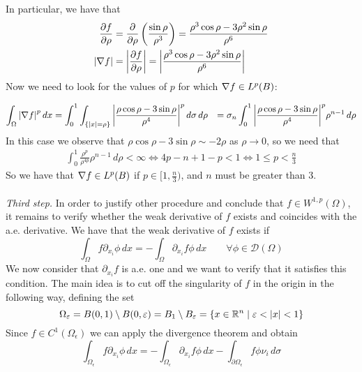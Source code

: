 In particular, we have that
\begin{align*}
\frac{\partial f}{\partial \rho} & = \frac{\partial }{\partial \rho}\left(\frac{\sin\rho}{\rho^3}\right) = \frac{\rho^3 \cos\rho  - 3  \rho^2 \sin\rho}{\rho^6}\\
\abs{\nabla f} & = \abs{\frac{\partial f}{\partial \rho}} = \abs{\frac{\rho^3 \cos\rho  - 3 \rho^2 \sin\rho }{\rho^6}}
\end{align*}
Now we need to look for the values of $p$ for which \(\nabla f \in L^p(B)\):

\begin{align*}
\int_\Omega \abs{\nabla f}^p \, dx &= \int_0^1 \int_{\left\{\abs{x} = \rho\right\}} \abs{\frac{\rho \cos\rho  - 3 \sin\rho }{\rho^4}}^p \, d\sigma \, d\rho 
                                  &= \sigma_n \int_0^1 \abs{\frac{\rho \cos\rho  - 3 \sin\rho }{\rho^4}}^p \rho^{n-1} \, d\rho \\
\end{align*}
In this case we observe that $\rho \cos\rho  - 3 \sin\rho \sim -2\rho$ as $\rho \to 0$, so we need that
\[
    \begin{split}
        \int_0^1 \frac{\rho^p} {\rho^{4p}} \rho^{n-1} \, d\rho < \infty \iff 4p - n + 1 - p < 1 \iff 1 \leq p < \frac{n}{3}
    \end{split}
\]
So we have that \(\nabla f \in L^p(B)\) if \(p \in [1, \frac{n}{3})\), and $n$ must be greater than 3.\\
\vspace{0.1cm}\\
\textit{Third step.} In order to justify other procedure and conclude that $f \in W^{1,p}(\Omega)$, 
it remains to verify whether the weak derivative of \(f\) exists and coincides with the a.e. derivative.
We have that the weak derivative of \(f\) exists if
\begin{equation}\label{eq:weak_derivative}
\int_\Omega f \partial_{x_i} \phi \, dx = - \int_\Omega \partial_{x_i} f \phi \, dx \qquad \forall \phi \in \mathcal{D}(\Omega)
\end{equation}
We now consider that $\partial_{x_i} f$ is a.e. one and we want to verify that it satisfies this condition. 
The main idea is to cut off the singularity of \(f\) in the origin in the following way, defining the set
\[
    \Omega_\varepsilon = B(0, 1) \setminus B(0, \varepsilon) = B_1 \setminus B_\varepsilon = \left\{ x \in \mathbb{R}^n \mid \varepsilon < \abs{x} < 1 \right\}
\]
Since \(f \in C^1(\Omega_\epsilon)\) we can apply the divergence theorem and obtain
\begin{equation}\label{eq:divergence}
\int_{\Omega_\epsilon} f \partial_{x_i} \phi \, dx = -\int_{\Omega_\epsilon} \partial_{x_i} f \phi \, dx - \int_{\partial\Omega_\epsilon} f \phi \nu_i \, d\sigma
\end{equation}
